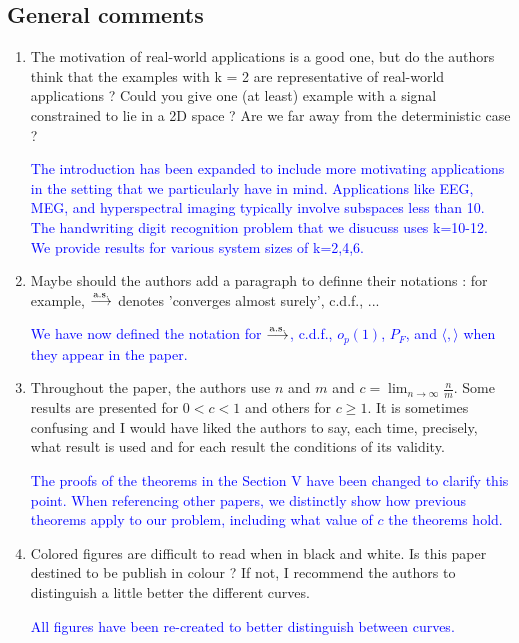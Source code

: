 \documentclass[11pt]{article}
\begin{document}
\subsection*{General comments}
\begin{enumerate}
\item The motivation of real-world applications is a good one, but do the authors think that the examples
with k = 2 are representative of real-world applications ? Could you give one (at least) example with a signal
constrained to lie in a 2D space ? Are we far away from the deterministic case ?

\textcolor{blue}{The introduction has been expanded to include more motivating applications in the setting that we particularly have in mind. Applications like EEG, MEG, and hyperspectral imaging typically involve subspaces less than 10. The handwriting digit recognition problem that we disucuss uses k=10-12. We provide results for various system sizes of k=2,4,6.}

\item Maybe should the authors add a paragraph to definne their notations : for example, $\overset{\textrm{a.s.}}{\longrightarrow}$  denotes 'converges
almost surely', c.d.f., ...

\textcolor{blue}{We have now defined the notation for $\overset{\textrm{a.s.}}{\longrightarrow}$, c.d.f., $o_p(1)$, $P_F$, and $\langle ,\rangle$ when they appear in the paper.}

\item Throughout the paper, the authors use $n$ and $m$ and $c = \lim_{n\to\infty}\frac{n}{m}$. Some results are presented for
$0 < c < 1$ and others for $c \geq1$. It is sometimes confusing and I would have liked the authors to say, each
time, precisely, what result is used and for each result the conditions of its validity.

\textcolor{blue}{The proofs of the theorems in the Section V have been changed to clarify this point. When referencing other papers, we distinctly show how previous theorems apply to our problem, including what value of $c$ the theorems hold.}

\item Colored figures are difficult to read when in black and white. Is this paper destined to be publish in
colour ? If not, I recommend the authors to distinguish a little better the different curves.

\textcolor{blue}{All figures have been re-created to better distinguish between curves.}

\end{enumerate}
\end{document}
